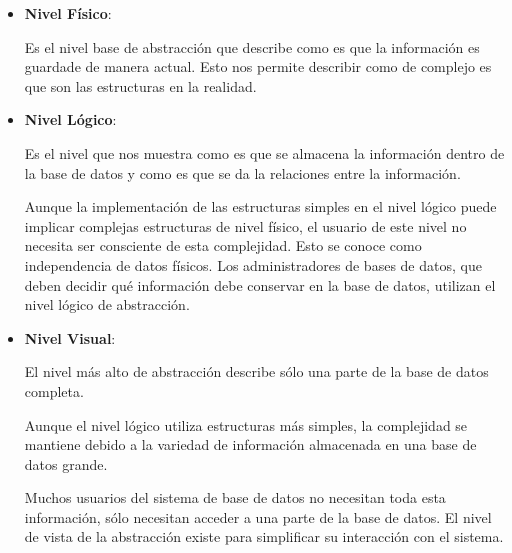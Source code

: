 \documentclass[12pt, fleqn]{report}                             %
\begin{document}
            \begin{itemize}
                \item
                    \textbf{Nivel Físico}: 

                    Es el nivel base de abstracción que describe como es que la información
                    es guardade de manera actual. Esto nos permite describir como de complejo
                    es que son las estructuras en la realidad.

                \item
                    \textbf{Nivel Lógico}: 

                    Es el nivel que nos muestra como es que se almacena la información dentro de
                    la base de datos y como es que se da la relaciones entre la información.

                    Aunque la implementación de las estructuras simples en el nivel lógico puede
                    implicar complejas estructuras de nivel físico, el usuario de este nivel no
                    necesita ser consciente de esta complejidad.
                    Esto se conoce como independencia de datos físicos. 
                    Los administradores de bases de datos, que deben decidir qué información debe
                    conservar en la base de datos, utilizan el nivel lógico de abstracción.

                \item
                    \textbf{Nivel Visual}: 

                    El nivel más alto de abstracción describe sólo una parte de la base de datos completa.

                    Aunque el nivel lógico utiliza estructuras más simples, la complejidad se mantiene
                    debido a la variedad de información almacenada en una base de datos grande.

                    Muchos usuarios del sistema de base de datos no necesitan toda esta información, 
                    sólo necesitan acceder a una parte de la base de datos.
                    El nivel de vista de la abstracción existe para simplificar su interacción
                    con el sistema.

            \end{itemize}



        \clearpage
\end{document}

